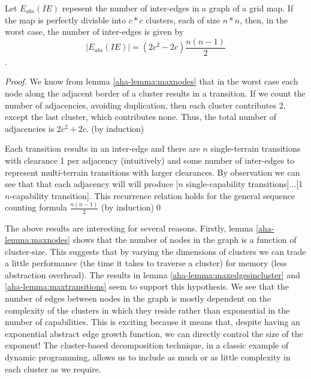 \begin{lemma}
\label{aha-lemma:maxtransitions}
Let $E_{abs}(IE)$ repesent the number of inter-edges in a graph of a grid map. If the map is perfectly divisble into $c*c$ clusters, each of size $n*n$, then, in the worst case, the number of inter-edges is given by 
$$|E_{abs}(IE)| = (2c^2 - 2c)\frac{n(n-1)}{2}$$.
\end{lemma}

\begin{proof}
We know from lemma \ref{aha-lemma:maxnodes} that in the worst case each node along the adjacent border of a cluster results in a transition. 
If we count the number of adjacencies, avoiding duplication, then each cluster contributes 2, except the last cluster, which contributes none. 
Thus, the total number of adjacencies is $2c^2 + 2c$. (by induction) 
\par \indent
Each transition results in an inter-edge and there are $n$ single-terrain transitions with clearance 1 per adjacency (intuitively) and some number of inter-edges to represent multi-terrain transitions with larger clearances. 
By observation we can see that that each adjacency will will produce [$n$ single-capability transitions]...[1 $n$-capability transition]. 
This recurrence relation holds for the general sequence counting formula $\frac{n(n-1)}{2}$ (by induction)\qed
\end{proof}

The above results are interesting for several reasons. 
Firstly, lemma \ref{aha-lemma:maxnodes} shows that the number of nodes in the graph is a function of cluster-size. This suggests that by varying the dimensions of clusters we can trade a little performance (the time it takes to traverse a cluster) for memory (less abstraction overhead).
The results in lemma \ref{aha-lemma:maxedgesincluster} and \ref{aha-lemma:maxtransitions} seem to support this hypothesis. 
We see that the number of edges between nodes in the graph is mostly dependent on the complexity of the clusters in which they reside rather than exponential in the number of capabilities. 
This is exciting because it means that, despite having an exponential abstract edge growth function, we can directly control the size of the exponent! 
The cluster-based decomposition technique, in a classic example of dynamic programming, allows us to include as much or as little complexity in each cluster as we require.
